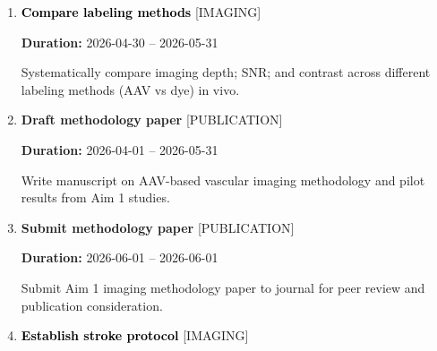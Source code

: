 \documentclass[landscape,a4paper]{article}
\begin{document}
\begin{enumerate}[leftmargin=1.5cm, itemsep=1em]
    \item \textcolor{black}{\textbf{\large Compare labeling methods}}
          \hfill \textcolor{black!60}{\small [IMAGING]}
          
          \vspace{0.2em}
          \textcolor{black!70}{\textbf{Duration:} 2026-04-30 -- 2026-05-31}

          \vspace{0.4em}
          \begin{minipage}[t]{0.9\textwidth}
          \textcolor{black!85}{Systematically compare imaging depth; SNR; and contrast across different labeling methods (AAV vs dye) in vivo.}
          \end{minipage}


    \item \textcolor{researchout}{\textbf{\large Draft methodology paper}}
          \hfill \textcolor{black!60}{\small [PUBLICATION]}
          
          \vspace{0.2em}
          \textcolor{black!70}{\textbf{Duration:} 2026-04-01 -- 2026-05-31}

          \vspace{0.4em}
          \begin{minipage}[t]{0.9\textwidth}
          \textcolor{black!85}{Write manuscript on AAV-based vascular imaging methodology and pilot results from Aim 1 studies.}
          \end{minipage}


    \item \textcolor{researchout}{\textbf{\large Submit methodology paper}}
          \hfill \textcolor{black!60}{\small [PUBLICATION]}
          
          \vspace{0.2em}
          \textcolor{black!70}{\textbf{Duration:} 2026-06-01 -- 2026-06-01}

          \vspace{0.4em}
          \begin{minipage}[t]{0.9\textwidth}
          \textcolor{black!85}{Submit Aim 1 imaging methodology paper to journal for peer review and publication consideration.}
          \end{minipage}


    \item \textcolor{black}{\textbf{\large Establish stroke protocol}}
          \hfill \textcolor{black!60}{\small [IMAGING]}
          

\end{enumerate}
\end{document}
